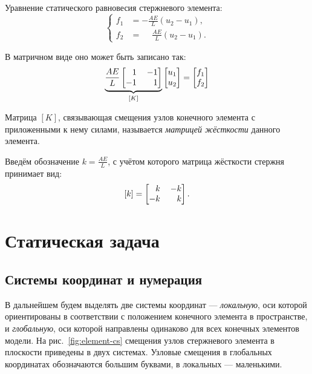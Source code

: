 \documentclass[10pt]{article}
\numberwithin{equation}{section}
\newcommand{\neword}{\emph}
\newcommand{\matr}[1]{[#1]}
\newcommand{\figref}[1]{рис. \ref{#1}}
\newcommand{\mm}{\llap{$-$}}
\newcommand{\phm}{\phantom{-}}
\begin{document}
Уравнение статического равновесия стержневого элемента:
\begin{equation}
  \begin{cases}
    f_1 &= -\frac{AE}{L}(u_2-u_1),\\
    f_2 &= \phm\frac{AE}{L}(u_2-u_1).
  \end{cases}
\end{equation}

В матричном виде оно может быть записано так:
\begin{equation}
  \label{eq:bar-equil}
  \underbrace{
  \frac{AE}{L}
  \begin{bmatrix}
    \phm{}1 && \mm1\\
    -1 && 1
  \end{bmatrix}}_{\matr{K}}
  \begin{bmatrix}
    u_1\\
    u_2
  \end{bmatrix}
  =
  \begin{bmatrix}
    f_1\\
    f_2
  \end{bmatrix}
\end{equation}

Матрица $\matr{K}$, связывающая смещения узлов конечного элемента с
приложенными к нему силами, называется \neword{матрицей жёсткости}
данного элемента. 

Введём обозначение $k = \frac{AE}{L}$, с учётом которого матрица
жёсткости стержня принимает вид:
\begin{equation}
  \label{eq:bar-stiffness}
  \matr{k} =
  \begin{bmatrix}
    \phm{}k&& \mm k\\
    -k && k
  \end{bmatrix}.
\end{equation}

\clearpage
\section{Статическая задача}

\subsection{Системы координат и нумерация}
\label{sec:notation}

В дальнейшем будем выделять две системы координат —
\neword{локальную}, оси которой ориентированы в соответствии с
положением конечного элемента в пространстве, и \neword{глобальную},
оси которой направлены одинаково для всех конечных элементов модели.
На \figref{fig:element-cs} смещения узлов стержневого элемента в
плоскости приведены в двух системах. Узловые смещения в глобальных
координатах обозначаются большим буквами, в локальных — маленькими.
\end{document}
